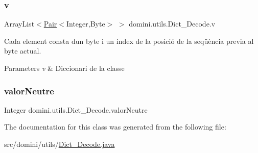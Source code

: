 \subsubsection{\texorpdfstring{v}{v}}
{\footnotesize\ttfamily Array\+List$<$\hyperlink{classdomini_1_1utils_1_1Pair}{Pair}$<$Integer,Byte$>$ $>$ domini.\+utils.\+Dict\+\_\+\+Decode.\+v\hspace{0.3cm}{\ttfamily [package]}}



Cada element consta d\textquotesingle{}un byte i un index de la posició de la seqüència previa al byte actual. 


\begin{DoxyParams}{Parameters}
{\em v} & Diccionari de la classe \\
\hline
\end{DoxyParams}
\mbox{\label{classdomini_1_1utils_1_1Dict__Decode_a6ef2d17f449cf7a658a4bf983e2fb474}} 
\subsubsection{\texorpdfstring{valor\+Neutre}{valorNeutre}}
{\footnotesize\ttfamily Integer domini.\+utils.\+Dict\+\_\+\+Decode.\+valor\+Neutre\hspace{0.3cm}{\ttfamily [package]}}



The documentation for this class was generated from the following file\+:\begin{DoxyCompactItemize}
\item 
src/domini/utils/\hyperlink{Dict__Decode_8java}{Dict\+\_\+\+Decode.\+java}\end{DoxyCompactItemize}
